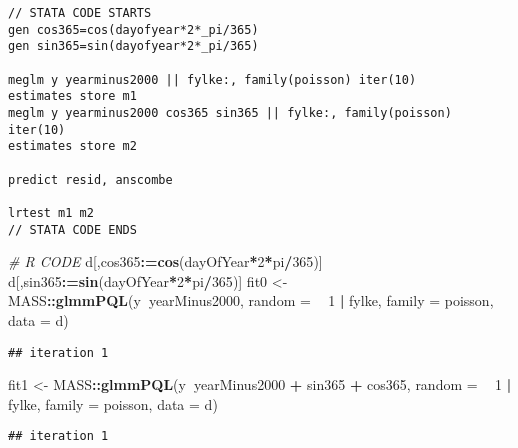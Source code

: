 \documentclass[]{book}
\newenvironment{Shaded}{\begin{snugshade}}{\end{snugshade}}
\newcommand{\KeywordTok}[1]{\textcolor[rgb]{0.13,0.29,0.53}{\textbf{#1}}}
\newcommand{\DataTypeTok}[1]{\textcolor[rgb]{0.13,0.29,0.53}{#1}}
\newcommand{\DecValTok}[1]{\textcolor[rgb]{0.00,0.00,0.81}{#1}}
\newcommand{\StringTok}[1]{\textcolor[rgb]{0.31,0.60,0.02}{#1}}
\newcommand{\CommentTok}[1]{\textcolor[rgb]{0.56,0.35,0.01}{\textit{#1}}}
\newcommand{\OperatorTok}[1]{\textcolor[rgb]{0.81,0.36,0.00}{\textbf{#1}}}
\newcommand{\ErrorTok}[1]{\textcolor[rgb]{0.64,0.00,0.00}{\textbf{#1}}}
\newcommand{\NormalTok}[1]{#1}
\begin{document}
\begin{verbatim}
// STATA CODE STARTS
gen cos365=cos(dayofyear*2*_pi/365)
gen sin365=sin(dayofyear*2*_pi/365)

meglm y yearminus2000 || fylke:, family(poisson) iter(10)
estimates store m1
meglm y yearminus2000 cos365 sin365 || fylke:, family(poisson) iter(10)
estimates store m2

predict resid, anscombe

lrtest m1 m2
// STATA CODE ENDS
\end{verbatim}

\begin{Shaded}
\begin{Highlighting}[]
\CommentTok{# R CODE}
\NormalTok{d[,cos365}\OperatorTok{:}\ErrorTok{=}\KeywordTok{cos}\NormalTok{(dayOfYear}\OperatorTok{*}\DecValTok{2}\OperatorTok{*}\NormalTok{pi}\OperatorTok{/}\DecValTok{365}\NormalTok{)]}
\NormalTok{d[,sin365}\OperatorTok{:}\ErrorTok{=}\KeywordTok{sin}\NormalTok{(dayOfYear}\OperatorTok{*}\DecValTok{2}\OperatorTok{*}\NormalTok{pi}\OperatorTok{/}\DecValTok{365}\NormalTok{)]}
\NormalTok{fit0 <-}\StringTok{ }\NormalTok{MASS}\OperatorTok{::}\KeywordTok{glmmPQL}\NormalTok{(y}\OperatorTok{~}\NormalTok{yearMinus2000, }\DataTypeTok{random =} \OperatorTok{~}\StringTok{ }\DecValTok{1} \OperatorTok{|}\StringTok{ }\NormalTok{fylke,}
                \DataTypeTok{family =}\NormalTok{ poisson, }\DataTypeTok{data =}\NormalTok{ d)}
\end{Highlighting}
\end{Shaded}

\begin{verbatim}
## iteration 1
\end{verbatim}

\begin{Shaded}
\begin{Highlighting}[]
\NormalTok{fit1 <-}\StringTok{ }\NormalTok{MASS}\OperatorTok{::}\KeywordTok{glmmPQL}\NormalTok{(y}\OperatorTok{~}\NormalTok{yearMinus2000 }\OperatorTok{+}\StringTok{ }\NormalTok{sin365 }\OperatorTok{+}\StringTok{ }\NormalTok{cos365, }\DataTypeTok{random =} \OperatorTok{~}\StringTok{ }\DecValTok{1} \OperatorTok{|}\StringTok{ }\NormalTok{fylke,}
                \DataTypeTok{family =}\NormalTok{ poisson, }\DataTypeTok{data =}\NormalTok{ d)}
\end{Highlighting}
\end{Shaded}

\begin{verbatim}
## iteration 1
\end{verbatim}
\end{document}
